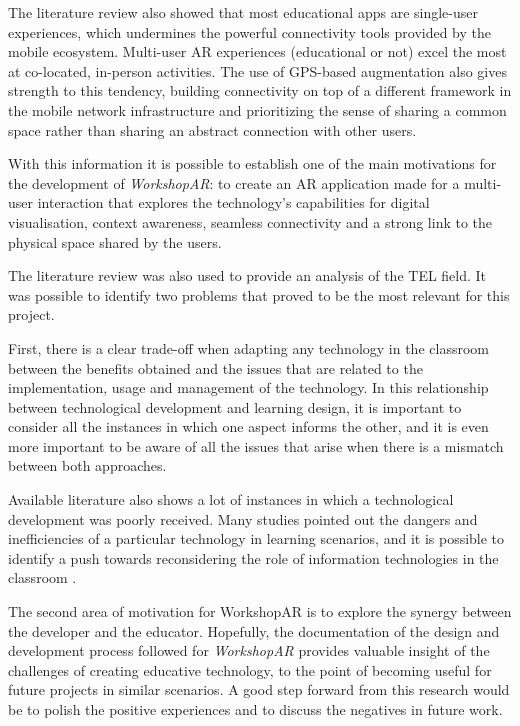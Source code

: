 The literature review also showed that most educational apps are single-user experiences, which undermines the powerful connectivity tools provided by the mobile ecosystem.
Multi-user \ac{AR} experiences (educational or not) excel the most at co-located, in-person activities. The use of GPS-based augmentation also gives strength to this tendency,
building connectivity on top of a different framework in the mobile network infrastructure and prioritizing the sense of sharing a common space rather than sharing an abstract
connection with other users.

With this information it is possible to establish  one of the main motivations for the development of \emph{WorkshopAR}: to create an \ac{AR} application made for a
multi-user interaction that explores the technology's capabilities for digital visualisation, context awareness, seamless connectivity and a strong link to the physical
space shared by the users.

The literature review was also used to provide an analysis of the TEL field. It was possible to identify two problems that proved to be the most relevant for this project.

First, there is a clear trade-off when adapting any technology in the classroom between the benefits obtained and the issues that are related to the implementation, usage
and management of the technology. In this relationship between technological development and learning design, it is important to consider all the instances in which one
aspect informs the other, and it is even more important to be aware of all the issues that arise when there is a mismatch between both approaches.

Available literature also shows a lot of instances in which a technological development was poorly received. Many studies pointed out the dangers and inefficiencies of a
particular technology in learning scenarios, and it is possible to identify a push towards reconsidering the role of information technologies in the classroom
\parencite{boonmoh_2021,becirovic_2023,ifinedo_2021}.

The second area of motivation for WorkshopAR is to explore the synergy between the developer and the educator. Hopefully, the documentation of the design and development
process followed for \emph{WorkshopAR} provides valuable insight of the challenges of creating educative technology, to the point of becoming useful for future projects in
similar scenarios. A good step forward from this research would be to polish the positive experiences and to discuss the negatives in future work.

